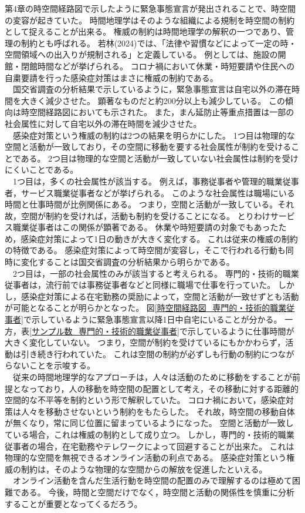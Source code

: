 \documentclass[paper={210mm,297mm},line_length=35zw,number_of_lines=31,head_space=30mm,gutter=40mm,baselineskip=2.0zw,headfoot_verticalposition=1.5zw]{jlreq} %
\begin{document}
第4章の時空間経路図で示したように緊急事態宣言が発出されることで、時空間の変容が起きていた。
時間地理学はそのような組織による規制を時空間の制約として捉えることが出来る。
権威の制約は時間地理学の解釈の一つであり、管理の制約とも呼ばれる。
若林(2024)では、「法律や習慣などによって一定の時・空間領域への出入りが規制される」と定義している。
例としては、施設の開館・閉館時間などが挙げられる。
コロナ禍において休業・時短要請や住民への自粛要請を行った感染症対策はまさに権威の制約である。\\
　国交省調査の分析結果で示しているように，緊急事態宣言は自宅以外の滞在時間を大きく減少させた。
顕著なものだと約200分以上も減少している。
この傾向は時空間経路図においても示された。
また，まん延防止等重点措置は一部の社会属性に対して自宅以外の滞在時間を減少させた。\\
　感染症対策という権威の制約は2つの結果を明らかにした。
1つ目は物理的な空間と活動が一致しており，その空間に移動を要する社会属性が制約を受けることである。
2つ目は物理的な空間と活動が一致していない社会属性は制約を受けにくいことである。\\
　1つ目は，多くの社会属性が該当する。
例えば，事務従事者や管理的職業従事者，サービス職業従事者などが挙げられる。
このような社会属性は職場にいる時間と仕事時間が比例関係にある。
つまり，空間と活動が一致している。それ故，空間が制約を受ければ，活動も制約を受けることになる。
とりわけサービス職業従事者はこの関係が顕著である。
休業や時短要請の対象でもあったため，感染症対策によって1日の動きが大きく変化する。
これは従来の権威の制約の特徴である。
感染症対策によって時空間が変容し，そこで行われる行動も同時に変化することは国交省調査の分析結果から明らかである。\\
　2つ目は，一部の社会属性のみが該当すると考えられる。
専門的・技術的職業従事者は，流行前では事務従事者などと同様に職場で仕事を行っていた。
しかし，感染症対策による在宅勤務の奨励によって，空間と活動が一致せずとも活動が可能となることが明らかとなった。
図\ref{時空間経路図_専門的・技術的職業従事者}で示しているように緊急事態宣言以降1日中自宅にいることが分かる。
一方，表\ref{サンプル数_専門的・技術的職業従事者}で示しているように仕事時間が大きく変化していない。
つまり，空間が制約を受けているにもかかわらず，活動は引き続き行われていた。
これは空間の制約が必ずしも行動の制約につながらないことを示唆する。\\
　従来の時間地理学的なアプローチは，人々は活動のために移動をすることが前提となっており，人の移動を時空間の配置として考え，その移動に対する距離的空間的な不平等を制約という形で解釈していた。
コロナ禍において，感染症対策は人々を移動させないという制約をもたらした。
それ故，時空間の移動自体が無くなり，常に同じ位置に留まっているようになった。
空間と活動が一致している場合，これは権威の制約として成り立つ。
しかし，専門的・技術的職業従事者の場合，在宅勤務やテレワークによって回避することが出来た。
これは物理的な空間を無視できるオンライン活動の利点である。
感染症対策という権威の制約は，そのような物理的な空間からの解放を促進したといえる。\\
　オンライン活動を含んだ生活行動を時空間の配置のみで理解するのは極めて困難である。
今後，時間と空間だけでなく，時空間と活動の関係性を慎重に分析することが重要となってくるだろう。\\
\end{document}
